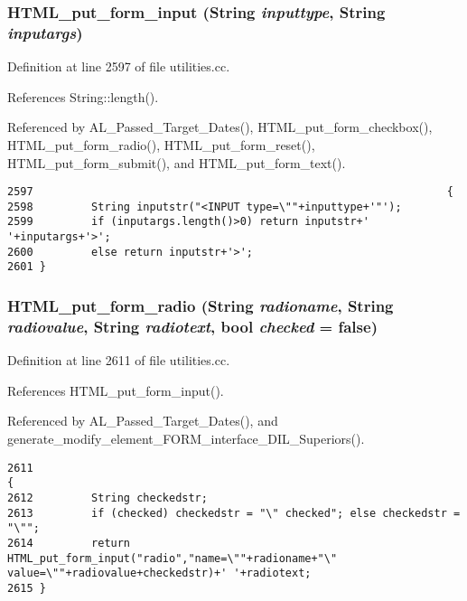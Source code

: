 \subsubsection{ HTML\_\-put\_\-form\_\-input ({\bf String} {\em inputtype}, {\bf String} {\em inputargs})}\label{utilities_8cc_a71}




Definition at line 2597 of file utilities.cc.

References String::length().

Referenced by AL\_\-Passed\_\-Target\_\-Dates(), HTML\_\-put\_\-form\_\-checkbox(), HTML\_\-put\_\-form\_\-radio(), HTML\_\-put\_\-form\_\-reset(), HTML\_\-put\_\-form\_\-submit(), and HTML\_\-put\_\-form\_\-text().



\footnotesize\begin{verbatim}2597                                                                {
2598         String inputstr("<INPUT type=\""+inputtype+'"');
2599         if (inputargs.length()>0) return inputstr+' '+inputargs+'>';
2600         else return inputstr+'>';
2601 }
\end{verbatim}\normalsize 
{}
\subsubsection{ HTML\_\-put\_\-form\_\-radio ({\bf String} {\em radioname}, {\bf String} {\em radiovalue}, {\bf String} {\em radiotext}, bool {\em checked} = {\bf false})}\label{utilities_8cc_a74}




Definition at line 2611 of file utilities.cc.

References HTML\_\-put\_\-form\_\-input().

Referenced by AL\_\-Passed\_\-Target\_\-Dates(), and generate\_\-modify\_\-element\_\-FORM\_\-interface\_\-DIL\_\-Superiors().



\footnotesize\begin{verbatim}2611                                                                                                         {
2612         String checkedstr;
2613         if (checked) checkedstr = "\" checked"; else checkedstr = "\"";
2614         return HTML_put_form_input("radio","name=\""+radioname+"\" value=\""+radiovalue+checkedstr)+' '+radiotext;
2615 }
\end{verbatim}\normalsize 
{}
